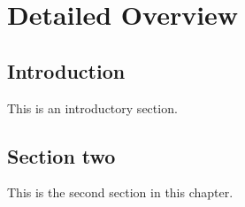 \chapter{Detailed Overview}
\label{ch:over}


\section{Introduction}
\label{over:s:intro}

This is an introductory section.

\section{Section two}

This is the second section in this chapter.

